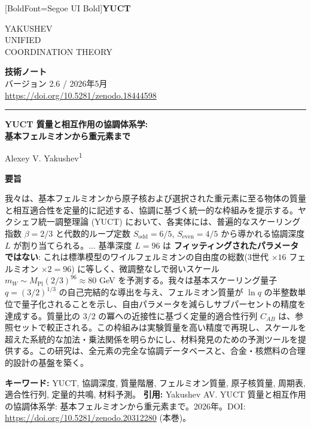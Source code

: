 \documentclass[11pt,a4paper]{article}
\theoremstyle{remark}
\newcommand{\makeheader}{%
	\noindent
	\begin{minipage}{0.17\textwidth}
		\raggedright
		{\fontspec{Segoe UI}[BoldFont=Segoe UI Bold]\bfseries\color{skyblue}\fontsize{46}{46}\selectfont YUCT}%
	\end{minipage}%
	\hspace{30pt}
	\begin{minipage}{0.32\textwidth}
		\raggedright
		{\sffamily\fontsize{11}{13}\selectfont YAKUSHEV\\ UNIFIED\\ COORDINATION THEORY}%
	\end{minipage}%
	\hfill
	\begin{minipage}{0.38\textwidth}
		\raggedleft
		{\sffamily\bfseries 技術ノート}\\ 
		{\sffamily バージョン 2.6 / 2026年5月}\\ 
		{\sffamily\footnotesize \url{https://doi.org/10.5281/zenodo.18444598}}%
	\end{minipage}
	\par\vspace{5pt}
	\noindent\textcolor{gold}{\rule{\textwidth}{1.6pt}}
	\par\vspace{0pt}
}
\begin{document}
	\thispagestyle{firstpage}
	\makeheader
	
	\vspace{0cm}
	{\LARGE\bfseries YUCT 質量と相互作用の協調体系学:\\ 
		\Large 基本フェルミオンから重元素まで \par}
	\vspace{0.2cm}
	
	{\large Alexey V. Yakushev\textsuperscript{1}} \\
	\vspace{0.0cm}
	
	{\color{darkblue}\textbf{\LARGE 要旨}} \par
	{\large
		\noindent
		我々は、基本フェルミオンから原子核および選択された重元素に至る物体の質量と相互適合性を定量的に記述する、協調に基づく統一的な枠組みを提示する。ヤクシェフ統一調整理論 (YUCT) において、各実体には、普遍的なスケーリング指数 \(\beta = 2/3\) と代数的ループ定数 \(S_{\mathrm{odd}}=6/5\), \(S_{\mathrm{even}}=4/5\) から導かれる協調深度 \(L\) が割り当てられる。... 基準深度 \(L=96\) は \textbf{フィッティングされたパラメータではない}: これは標準模型のワイルフェルミオンの自由度の総数(3世代 $\times 16$ フェルミオン $\times 2 = 96$) に等しく、微調整なしで弱いスケール $m_W \sim M_{\mathrm{Pl}}(2/3)^{96} \approx 80$ GeV を予測する。我々は基本スケーリング量子 \(q = (3/2)^{1/3}\) の自己完結的な導出を与え、フェルミオン質量が \(\ln q\) の半整数単位で量子化されることを示し、自由パラメータを減らしサブパーセントの精度を達成する。質量比の \(3/2\) の冪への近接性に基づく定量的適合性行列 \(C_{AB}\) は、参照セットで較正される。この枠組みは実験質量を高い精度で再現し、スケールを超えた系統的な加法・乗法関係を明らかにし、材料発見のための予測ツールを提供する。この研究は、全元素の完全な協調データベースと、合金・核燃料の合理的設計の基盤を築く。}
	
	\vspace{0.1cm}
	\noindent
	{\color{darkblue}\textbf{キーワード:}} YUCT, 協調深度, 質量階層, フェルミオン質量, 原子核質量, 周期表, 適合性行列, 定量的共鳴, 材料予測。
	\vspace{0.1cm}
	\noindent
	{\color{darkblue}\textbf{引用:}} Yakushev AV. YUCT 質量と相互作用の協調体系学: 基本フェルミオンから重元素まで。2026年。DOI: \url{https://doi.org/10.5281/zenodo.20312280} (本巻)。
	
	\vspace{0.4cm}
	
\end{document}
